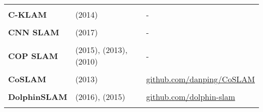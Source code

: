 \documentclass[a4paper,12pt]{scrartcl}
\begin{document}
{\begin{longtable}{l|l|l}
                           &                                                                                             &                                                                       \\ [-3mm]
    \textbf{C-KLAM}        & \cite{Nerurkar2014} (2014)                                                                  & -                                                                     \\
                           &                                                                                             &                                                                       \\ [-3mm]
    \textbf{CNN SLAM}      & \cite{Tateno2017} (2017)                                                                    & -                                                                     \\
                           &                                                                                             &                                                                       \\ [-3mm]
    \textbf{COP SLAM}      & \cite{Dubbelman2015} (2015), \cite{Dubbelman2013} (2013), \cite{Dubbelman2010} (2010)       & -                                                                     \\
                           &                                                                                             &                                                                       \\ [-3mm]
    \textbf{CoSLAM}        & \cite{Zou2013} (2013)                                                                       & {\url{github.com/danping/CoSLAM}}                                     \\
                           &                                                                                             &                                                                       \\ [-3mm]
    \textbf{DolphinSLAM}   & \cite{Zaffari2016} (2016), \cite{Silveira2015} (2015)                                       & {\url{github.com/dolphin-slam}}                                       \\
                           &                                                                                             &                                                                       \\ [-3mm]

\end{longtable}}
\end{document}
